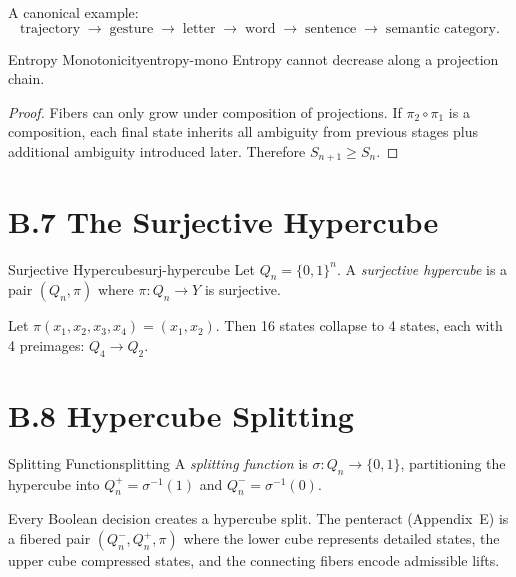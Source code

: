 A canonical example:
\[
  \text{trajectory} \;\to\; \text{gesture} \;\to\;
  \text{letter} \;\to\; \text{word} \;\to\;
  \text{sentence} \;\to\; \text{semantic category.}
\]

\begin{theorem}{Entropy Monotonicity}{entropy-mono}
  Entropy cannot decrease along a projection chain.
\end{theorem}

\begin{proof}
  Fibers can only grow under composition of projections. If
  $\pi_2 \circ \pi_1$ is a composition, each final state inherits all
  ambiguity from previous stages plus additional ambiguity introduced later.
  Therefore $S_{n+1} \geq S_n$.
\end{proof}

\section*{B.7 The Surjective Hypercube}

\begin{definition}{Surjective Hypercube}{surj-hypercube}
  Let $Q_n = \{0,1\}^n$. A \emph{surjective hypercube} is a pair
  $(Q_n, \pi)$ where $\pi : Q_n \to Y$ is surjective.
\end{definition}

\begin{example}
  Let $\pi(x_1,x_2,x_3,x_4) = (x_1,x_2)$. Then 16 states collapse to
  4 states, each with 4 preimages: $Q_4 \to Q_2$.
\end{example}

\section*{B.8 Hypercube Splitting}

\begin{definition}{Splitting Function}{splitting}
  A \emph{splitting function} is $\sigma : Q_n \to \{0,1\}$, partitioning
  the hypercube into $Q_n^+ = \sigma^{-1}(1)$ and $Q_n^- = \sigma^{-1}(0)$.
\end{definition}

Every Boolean decision creates a hypercube split. The penteract (Appendix~E)
is a fibered pair $(Q_n^-, Q_n^+, \pi)$ where the lower cube represents
detailed states, the upper cube compressed states, and the connecting fibers
encode admissible lifts.

